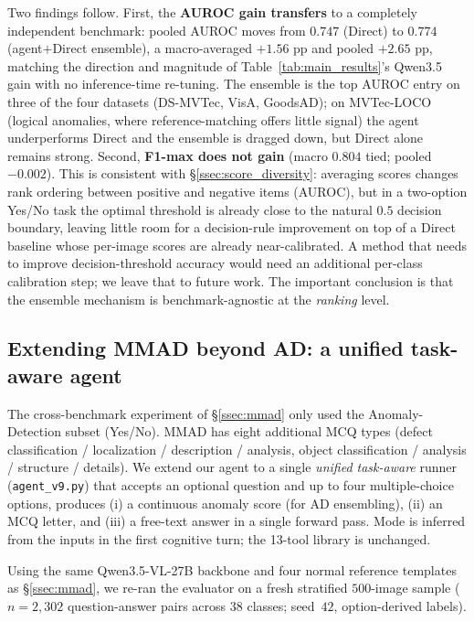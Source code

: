 Two findings follow. First, the \textbf{AUROC gain transfers} to a completely independent benchmark: pooled AUROC moves from $0.747$ (Direct) to $0.774$ (agent$+$Direct ensemble), a macro-averaged $+1.56$ pp and pooled $+2.65$ pp, matching the direction and magnitude of Table~\ref{tab:main_results}'s Qwen3.5 gain with no inference-time re-tuning. The ensemble is the top AUROC entry on three of the four datasets (DS-MVTec, VisA, GoodsAD); on MVTec-LOCO (logical anomalies, where reference-matching offers little signal) the agent underperforms Direct and the ensemble is dragged down, but Direct alone remains strong. Second, \textbf{F1-max does not gain} (macro $0.804$ tied; pooled $-0.002$). This is consistent with \S\ref{ssec:score_diversity}: averaging scores changes rank ordering between positive and negative items (AUROC), but in a two-option Yes/No task the optimal threshold is already close to the natural $0.5$ decision boundary, leaving little room for a decision-rule improvement on top of a Direct baseline whose per-image scores are already near-calibrated. A method that needs to improve decision-threshold accuracy would need an additional per-class calibration step; we leave that to future work. The important conclusion is that the ensemble mechanism is benchmark-agnostic at the \emph{ranking} level.

\subsection{Extending MMAD beyond AD: a unified task-aware agent}
\label{ssec:mmad_v9}

The cross-benchmark experiment of \S\ref{ssec:mmad} only used the
Anomaly-Detection subset (Yes/No). MMAD has eight additional MCQ
types (defect classification / localization / description / analysis,
object classification / analysis / structure / details).  We extend
our agent to a single \emph{unified task-aware} runner (\texttt{agent\_v9.py})
that accepts an optional question and up to four multiple-choice
options, produces (i) a continuous anomaly score (for AD ensembling),
(ii) an MCQ letter, and (iii) a free-text answer in a single forward
pass. Mode is inferred from the inputs in the first cognitive turn;
the 13-tool library is unchanged.

Using the same Qwen3.5-VL-27B backbone and four normal reference
templates as \S\ref{ssec:mmad}, we re-ran the evaluator on a fresh
stratified $500$-image sample ($n{=}2{,}302$ question-answer pairs
across 38 classes; seed~$42$, option-derived labels).

